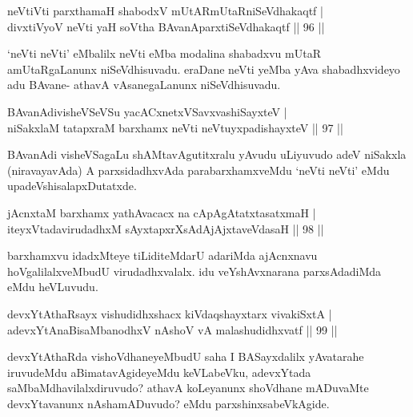 \begin{shl}
neVtiVti parxthamaH shabodxV mUtARmUtaRniSeVdhakaqtf |\\
divxtiVyoV neVti yaH soV\s tha BAvanAparxtiSeVdhakaqtf \hfill || 96 ||
\end{shl}

\begin{artha}
`neVti neVti' eMbalilx neVti eMba modalina shabadxvu mUtaR amUtaRgaLanunx niSeVdhisuvadu. eraDane neVti yeMba yAva shabadhxvideyo adu BAvane- athavA vAsanegaLanunx niSeVdhisuvadu.
\end{artha}


\begin{shl}
BAvanAdivisheVSeVSu yacACxnetxVSavxvashiSayxteV |\\
niSakxlaM tatapxraM barxhamx neVti neVtuyxpadishayxteV \hfill || 97 ||
\end{shl}

\begin{artha}
BAvanAdi visheVSagaLu shAMtavAgutitxralu yAvudu uLiyuvudo adeV niSakxla (niravayavAda) A parxsidadhxvAda parabarxhamxveMdu `neVti neVti' eMdu upadeVshisalapxDutatxde.
\end{artha}

\begin{shl}
jAcnxtaM barxhamx yathAvacacx na cApAgAtatxtasatxmaH |\\
iteyxVtadavirudadhxM sAyxtapxrXsAdAjAjxtaveVdasaH \hfill || 98 ||
\end{shl}

\begin{artha}
barxhamxvu idadxMteye tiLiditeMdarU adariMda ajAcnxnavu hoVgalilalxveMbudU virudadhxvalalx. idu veYshAvxnarana parxsAdadiMda eMdu heVLuvudu.
\end{artha}


\begin{shl}
devxYtAthaRsayx vishudidhxshacx kiVdaqshayxtarx vivakiSxtA |\\
adevxYtAnaBisaMbanodhxV nAshoV vA malashudidhxvatf \hfill || 99 ||
\end{shl}

\begin{artha}
devxYtAthaRda vishoVdhaneyeMbudU saha I BASayxdalilx yAvatarahe iruvudeMdu aBimatavAgideyeMdu keVLabeVku, adevxYtada saMbaMdhavilalxdiruvudo? athavA koLeyanunx shoVdhane mADuvaMte devxYtavanunx nAshamADuvudo? eMdu parxshinxsabeVkAgide.
\end{artha}

